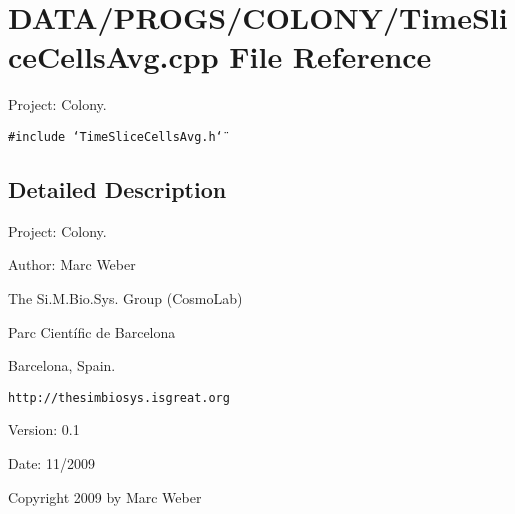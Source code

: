 \section{DATA/PROGS/COLONY/TimeSliceCellsAvg.cpp File Reference}
\label{TimeSliceCellsAvg_8cpp}
Project: Colony. 

{\tt \#include \char`\"{}TimeSliceCellsAvg.h\char`\"{}}\par


\subsection{Detailed Description}
Project: Colony. 

\begin{Desc}
\item[Author:]Marc Weber\par
 The Si.M.Bio.Sys. Group (CosmoLab)\par
 Parc Científic de Barcelona\par
 Barcelona, Spain.\par
 {\tt http://thesimbiosys.isgreat.org} \end{Desc}
\begin{Desc}
\item[Version:]0.1 \end{Desc}
\begin{Desc}
\item[Date:]11/2009\end{Desc}
Copyright 2009 by Marc Weber 